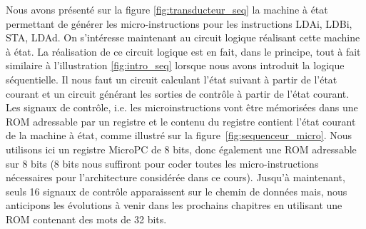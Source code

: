 Nous avons présenté sur la figure \ref{fig:transducteur_seq} la machine à état permettant de générer les micro-instructions pour les instructions LDAi, LDBi, STA, LDAd. On s'intéresse maintenant au circuit logique réalisant cette machine à état. La réalisation de ce circuit logique est en fait, dans le principe, tout à fait similaire à l'illustration \ref{fig:intro_seq} lorsque nous avons introduit la logique séquentielle. Il nous faut un circuit calculant l'état suivant à partir de l'état courant et un circuit générant les sorties de contrôle à partir de l'état courant. Les signaux de contrôle, i.e. les microinstructions vont être mémorisées dans une ROM adressable par un registre et le contenu du registre contient l'état courant de la machine à état, comme illustré sur la figure~\ref{fig:sequenceur_micro}. Nous utilisons ici un registre MicroPC de $8$ bits, donc également une ROM adressable sur 8 bits (8 bits nous suffiront pour coder toutes les micro-instructions nécessaires pour l'architecture considérée dans ce cours). Jusqu'à maintenant, seuls 16 signaux de contrôle apparaissent sur le chemin de données mais, nous anticipons les évolutions à venir dans les prochains chapitres en utilisant une ROM contenant des mots de 32 bits.


